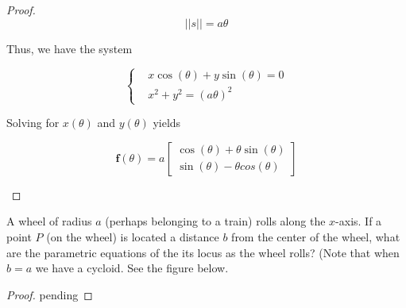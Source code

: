 \begin{exercise}
\begin{proof}
        \[ \vert \vert s \vert \vert = a \theta \]
        
        Thus, we have the system
        
        \[
        \begin{cases}
            &x\cos(\theta) + y\sin(\theta) = 0 \\
            &x^2 + y^2 = (a\theta)^2
        \end{cases}
        \]
        
        Solving for \( x(\theta) \) and \( y(\theta) \) yields
        
        \[
        \mathbf{f}(\theta) = 
        a \begin{bmatrix} 
            \cos(\theta) + \theta\sin(\theta) \\ 
            \sin(\theta) - \theta cos(\theta) 
        \end{bmatrix}
        \]

        \begin{center}
        \end{center}
    \end{proof}
\end{exercise}

\begin{exercise} \label{e2.1.4}
    A wheel of radius \( a \) (perhaps belonging to a train) rolls along the \( x \)-axis. If a point \( P \) (on the wheel) is located a distance \( b \) from the center of the wheel, what are the parametric equations of the its locus as the wheel rolls? (Note that when \( b = a \) we have a cycloid. See the figure below.
    
    
    \begin{proof}
        pending
    \end{proof}
\end{exercise}

